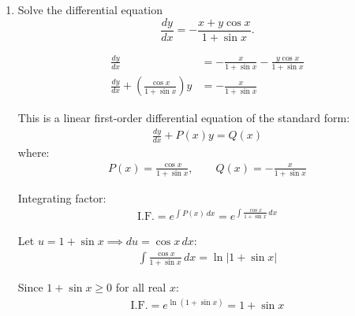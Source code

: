 \begin{enumerate}[label=\thesubsection.\arabic*, ref=\thesubsection.\theenumi]
Rearranging the variables $v$ and $x$:
\begin{align*}
	\frac{dv}{\tan v} &= -\frac{dx}{x} \implies
	\cot v\,dv = -\frac{dx}{x}
\end{align*}

Integrating both sides:
\begin{align*}
	\int \cot v\,dv &= -\int \frac{1}{x}\,dx \\
	\ln|\sin v| &= -\ln|x| + \ln C_1
\end{align*}
where $\ln C_1$ is an arbitrary constant ($C_1 > 0$).

Using logarithmic properties:
\begin{align*}
	\ln|\sin v| + \ln|x| &= \ln C_1 \implies
	x \sin v = C
\end{align*}
where $C = \pm C_1$ is an arbitrary real non-zero constant.

Substituting $v = \dfrac{y}{x}$ back into the solution:
\begin{align*}
	x\sin\left(\frac{y}{x}\right) = C
\end{align*}


\item Solve the differential equation
\[
\frac{dy}{dx}=-\frac{x+y\cos x}{1+\sin x}.
\]

\solution
\begin{align*}
	\frac{dy}{dx} &= -\frac{x}{1 + \sin x} - \frac{y\cos x}{1 + \sin x} \\
	\frac{dy}{dx} + \left(\frac{\cos x}{1 + \sin x}\right)y &= -\frac{x}{1 + \sin x}
\end{align*}

This is a linear first-order differential equation of the standard form:
\begin{align*}
	\frac{dy}{dx} + P(x)y = Q(x)
\end{align*}
where:
\begin{align*}
	P(x) = \frac{\cos x}{1 + \sin x}, \qquad Q(x) = -\frac{x}{1 + \sin x}
\end{align*}

Integrating factor:
\begin{align*}
	\text{I.F.} = e^{\int P(x)\,dx} = e^{\int \frac{\cos x}{1 + \sin x}\,dx}
\end{align*}

Let $u = 1 + \sin x \implies du = \cos x\,dx$:
\begin{align*}
	\int \frac{\cos x}{1 + \sin x}\,dx = \ln|1 + \sin x|
\end{align*}

Since $1 + \sin x \ge 0$ for all real $x$:
\begin{align*}
	\text{I.F.} = e^{\ln(1 + \sin x)} = 1 + \sin x
\end{align*}


\end{enumerate}
